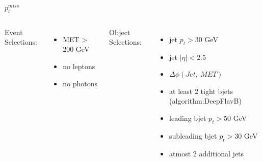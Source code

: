 \documentclass[10pt,xcolor=dvipsnames]{beamer}
\begin{document}
\begin{frame}[fragile]{$p^{miss}_t$ }
\begin{columns}
    Event Selections:
    \begin{itemize}
      \raggedright 
      \tiny
      \item {MET > 200 GeV}
      \item {no leptons}
      \item {no photons}
    \end{itemize}
    Object Selections:
    \begin{itemize}
      \raggedright 
      \tiny
      \item {jet $p_t > 30 $ GeV}
      \item {jet $| \eta | < 2.5 $}
      \item {$\Delta \phi (Jet, \ MET)$}
      \item {at least 2 tight bjets (algorithm:DeepFlavB)}
      \item {leading bjet $p_t > 50 $ GeV}
      \item {subleading bjet $p_t > 30 $ GeV}
      \item {atmost 2 additional jets}
    \end{itemize}
  \end{columns}
\end{frame}

\end{document}
